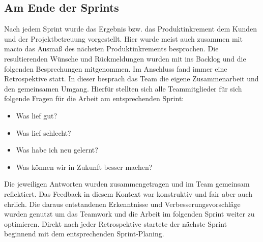 \documentclass[10pt, a4paper]{article}
\begin{document}
\subsection{Am Ende der Sprints}
Nach jedem Sprint wurde das Ergebnis bzw. das Produktinkrement dem Kunden und der Projektbetreuung vorgestellt.
Hier wurde meist auch zusammen mit macio das Ausmaß des nächsten Produktinkrements besprochen.
Die resultierenden Wünsche und Rückmeldungen wurden mit ins Backlog und die folgenden Besprechungen mitgenommen.
Im Anschluss fand immer eine Retrospektive statt.
In dieser besprach das Team die eigene Zusammenarbeit und den gemeinsamen Umgang.
Hierfür stellten sich alle Teammitglieder für sich folgende Fragen für die Arbeit am entsprechenden Sprint:
\begin{itemize}[noitemsep,topsep=0pt,parsep=0pt,partopsep=0pt]
  \item Was lief gut?
  \item Was lief schlecht?
  \item Was habe ich neu gelernt?
  \item Was können wir in Zukunft besser machen?
\end{itemize}
Die jeweiligen Antworten wurden zusammengetragen und im Team gemeinsam reflektiert.
Das Feedback in diesem Kontext war konstruktiv und fair aber auch ehrlich.
Die daraus entstandenen Erkenntnisse und Verbesserungsvorschläge wurden genutzt um das Teamwork und die Arbeit im folgenden Sprint weiter zu optimieren.
Direkt nach jeder Retrospektive startete der nächste Sprint beginnend mit dem entsprechenden Sprint-Planing.
\end{document}
